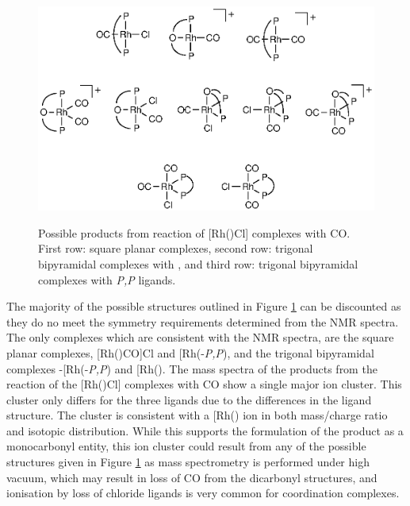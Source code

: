 \begin{figure}[htb]
\begin{center}
\vspace{0.5cm}
\includegraphics{../Figures/RhCOpossibilities.eps}
\caption[Possible products from reaction of \texorpdfstring{[Rh(\tBuxantphosk)Cl{]} complexes with CO} R]{Possible products from reaction of \texorpdfstring{[Rh(\tBuxantphosk)Cl] complexes with CO} R.  First row: square planar complexes, second row: trigonal bipyramidal complexes with \POP{} \tBuxantphos{}, and third row: trigonal bipyramidal complexes with \dento{}\emph{P,P}\textprime{} \tBuxantphos{} ligands.}
\vspace{0.2cm}
\label{RhCOpossibilities}
\end{center}
\end{figure}
\vspace{0.2cm}

The majority of the possible structures outlined in Figure \ref{RhCOpossibilities} can be discounted as they do no meet the symmetry requirements determined from the NMR spectra.  The only complexes which are consistent with the NMR spectra, are the square planar complexes, [Rh(\tBuxantphosk)CO]Cl and [Rh(\tBuxantphos-\dento{}\emph{P,P}\textprime)\ce{(CO)2]Cl}, and the trigonal bipyramidal complexes \trans-[Rh(\tBuxantphos-\dento{}\emph{P,P}\textprime)\ce{(CO)2Cl]} and [Rh(\tBuxantphosk)\ce{CO2]+}.  The mass spectra of the products from the reaction of the [Rh(\tBuxantphos)Cl] complexes with CO show a single major ion cluster.  This cluster only differs for the three ligands due to the differences in the ligand structure.  The cluster is consistent with a [Rh(\tBuxantphos)\ce{(CO)]+} ion in both mass/charge ratio and isotopic distribution.  While this supports the formulation of the product as a monocarbonyl entity, this ion cluster could result from any of the possible structures given in Figure \ref{RhCOpossibilities} as mass spectrometry is performed under high vacuum, which may result in loss of CO from the dicarbonyl structures, and ionisation by loss of chloride ligands is very common for coordination complexes.\cite{Henderson1998}

